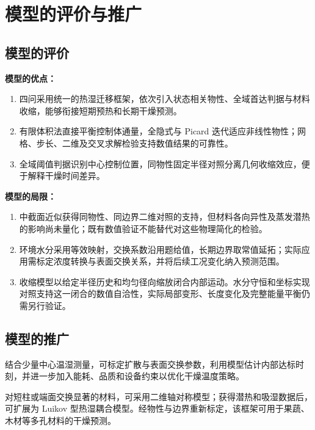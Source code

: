 \section{模型的评价与推广}

\subsection{模型的评价}

\textbf{模型的优点：}
\begin{enumerate}
\item 四问采用统一的热湿迁移框架，依次引入状态相关物性、全域首达判据与材料收缩，能够衔接短期预热和长期干燥预测。
\item 有限体积法直接平衡控制体通量，全隐式与 Picard 迭代适应非线性物性；网格、步长、二维及交叉求解检验支持数值结果的可靠性。
\item 全域阈值判据识别中心控制位置，同物性固定半径对照分离几何收缩效应，便于解释干燥时间差异。
\end{enumerate}

\textbf{模型的局限：}
\begin{enumerate}
\item 中截面近似获得同物性、同边界二维对照的支持，但材料各向异性及蒸发潜热的影响尚未量化；既有数值验证不能替代对这些物理简化的检验。
\item 环境水分采用等效映射，交换系数沿用题给值，长期边界取常值延拓；实际应用需标定浓度转换与表面交换关系，并将后续工况变化纳入预测范围。
\item 收缩模型以给定半径历史和均匀径向缩放闭合内部运动。水分守恒和坐标实现对照支持这一闭合的数值自洽性，实际局部变形、长度变化及完整能量平衡仍需另行验证。
\end{enumerate}

\subsection{模型的推广}

结合少量中心温湿测量，可标定扩散与表面交换参数，利用模型估计内部达标时刻，并进一步加入能耗、品质和设备约束以优化干燥温度策略。

对短柱或端面交换显著的材料，可采用二维轴对称模型；获得潜热和吸湿数据后，可扩展为 Luikov 型热湿耦合模型\cite{luikov1975}。经物性与边界重新标定，该框架可用于果蔬、木材等多孔材料的干燥预测。
